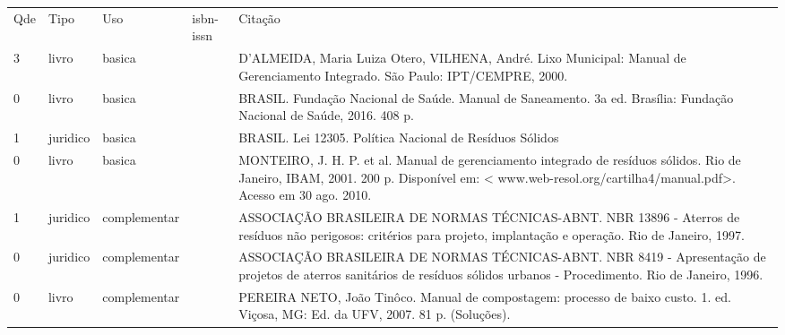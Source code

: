 \documentclass[12pt,a4paper,twoside]{report}
\begin{document}
\begin{tabular}{llllp{8cm}}
Qde & Tipo & Uso & isbn-issn & Citação \\
3&livro&basica&&D’ALMEIDA, Maria Luiza Otero, VILHENA, André. Lixo Municipal: Manual de Gerenciamento Integrado. São Paulo: IPT/CEMPRE, 2000.\\
0&livro&basica&&BRASIL. Fundação Nacional de Saúde. Manual de Saneamento. 3a ed. Brasília: Fundação Nacional de Saúde, 2016. 408 p.\\
1&juridico&basica&&BRASIL. Lei 12305. Política Nacional de Resíduos Sólidos\\
0&livro&basica&&MONTEIRO, J. H. P. et al. Manual de gerenciamento integrado de resíduos sólidos. Rio de Janeiro, IBAM, 2001. 200 p. Disponível em: < www.web-resol.org/cartilha4/manual.pdf>. Acesso em 30 ago. 2010.\\
1&juridico&complementar&&ASSOCIAÇÃO BRASILEIRA DE NORMAS TÉCNICAS-ABNT. NBR 13896 - Aterros de resíduos não perigosos: critérios para projeto, implantação e operação. Rio de Janeiro, 1997.\\
0&juridico&complementar&&ASSOCIAÇÃO BRASILEIRA DE NORMAS TÉCNICAS-ABNT. NBR 8419 - Apresentação de projetos de aterros sanitários de resíduos sólidos urbanos - Procedimento. Rio de Janeiro, 1996.\\
0&livro&complementar&&PEREIRA NETO, João Tinôco. Manual de compostagem: processo de baixo custo. 1. ed. Viçosa, MG: Ed. da UFV, 2007. 81 p. (Soluções).\\
\end{tabular}
\end{document}
